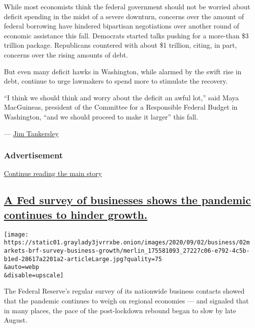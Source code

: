 While most economists think the federal government should not be worried
about deficit spending in the midst of a severe downturn, concerns over
the amount of federal borrowing have hindered bipartisan negotiations
over another round of economic assistance this fall. Democrats started
talks pushing for a more-than \$3 trillion package. Republicans
countered with about \$1 trillion, citing, in part, concerns over the
rising amounts of debt.

But even many deficit hawks in Washington, while alarmed by the swift
rise in debt, continue to urge lawmakers to spend more to stimulate the
recovery.

``I think we should think and worry about the deficit an awful lot,''
said Maya MacGuineas, president of the Committee for a Responsible
Federal Budget in Washington, ``and we should proceed to make it
larger'' this fall.

--- \href{https://www.nytimes3xbfgragh.onion/by/jim-tankersley}{Jim
Tankersley}

\hypertarget{advertisement}{%
\subsubsection{Advertisement}\label{advertisement}}

\protect\hyperlink{after-dfp-ad-mid1}{Continue reading the main story}

\hypertarget{a-fed-survey-of-businesses-shows-the-pandemic-continues-to-hinder-growth}{%
\subsection{\texorpdfstring{\protect\hyperlink{a-fed-survey-of-businesses-shows-the-pandemic-continues-to-hinder-growth}{A
Fed survey of businesses shows the pandemic continues to hinder
growth.}}{A Fed survey of businesses shows the pandemic continues to hinder growth.}}\label{a-fed-survey-of-businesses-shows-the-pandemic-continues-to-hinder-growth}}

\texttt{[image: https://static01.graylady3jvrrxbe.onion/images/2020/09/02/business/02markets-brf-survey-business-growth/merlin\_175581093\_27227c06-e792-4c5b-b1ed-28617a2201a2-articleLarge.jpg?quality=75\\\&auto=webp\\\&disable=upscale]}

The Federal Reserve's regular survey of its nationwide business contacts
showed that the pandemic continues to weigh on regional economies ---
and signaled that in many places, the pace of the post-lockdown rebound
began to slow by late August.

